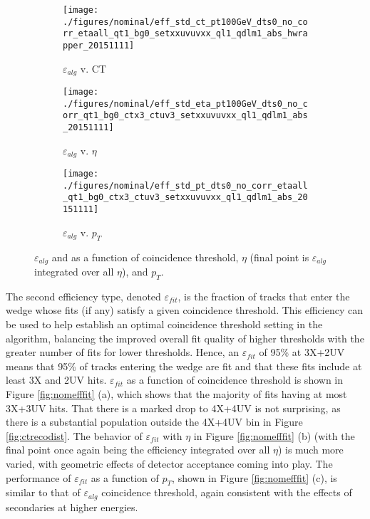 \begin{figure}[!htbp]\captionsetup{justification=centering}
  \begin{center}
    \begin{subfigure}{0.3\textwidth}\caption{$\varepsilon_{alg}$ v. CT}\texttt{[image: ./figures/nominal/eff\_std\_ct\_pt100GeV\_dts0\_no\_corr\_etaall\_qt1\_bg0\_setxxuvuvxx\_ql1\_qdlm1\_abs\_hwrapper\_20151111]}\end{subfigure}
    \begin{subfigure}{0.3\textwidth}\caption{$\varepsilon_{alg}$ v. $\eta$}\texttt{[image: ./figures/nominal/eff\_std\_eta\_pt100GeV\_dts0\_no\_corr\_qt1\_bg0\_ctx3\_ctuv3\_setxxuvuvxx\_ql1\_qdlm1\_abs\_20151111]}\end{subfigure}
    \begin{subfigure}{0.3\textwidth}\caption{$\varepsilon_{alg}$ v. $p_T$}\texttt{[image: ./figures/nominal/eff\_std\_pt\_dts0\_no\_corr\_etaall\_qt1\_bg0\_ctx3\_ctuv3\_setxxuvuvxx\_ql1\_qdlm1\_abs\_20151111]}\end{subfigure}
  \caption{\label{fig:nomeffalg} $\varepsilon_{alg}$ and as a function of coincidence threshold, $\eta$ (final point is $\varepsilon_{alg}$ integrated over all $\eta$), and $p_T$.}
  \end{center}
\end{figure}

The second efficiency type, denoted $\varepsilon_{fit}$, is the fraction of tracks that enter the wedge whose fits (if any) satisfy a given coincidence threshold.  This efficiency can be used to help establish an optimal coincidence threshold setting in the algorithm, balancing the improved overall fit quality of higher thresholds with the greater number of fits for lower thresholds.  Hence, an $\varepsilon_{fit}$ of 95\% at 3X+2UV means that 95\% of tracks entering the wedge are fit and that these fits include at least 3X and 2UV hits.  $\varepsilon_{fit}$ as a function of coincidence threshold is shown in Figure \ref{fig:nomefffit} (a), which shows that the majority of fits having at most 3X+3UV hits.  That there is a marked drop to 4X+4UV is not surprising, as there is a substantial population outside the 4X+4UV bin in Figure \ref{fig:ctrecodist}.  The behavior of $\varepsilon_{fit}$ with $\eta$ in Figure \ref{fig:nomefffit} (b) (with the final point once again being the efficiency integrated over all $\eta$) is much more varied, with geometric effects of detector acceptance coming into play.  The performance of $\varepsilon_{fit}$ as a function of $p_T$, shown in Figure \ref{fig:nomefffit} (c), is similar to that of $\varepsilon_{alg}$ coincidence threshold, again consistent with the effects of secondaries at higher energies.  

